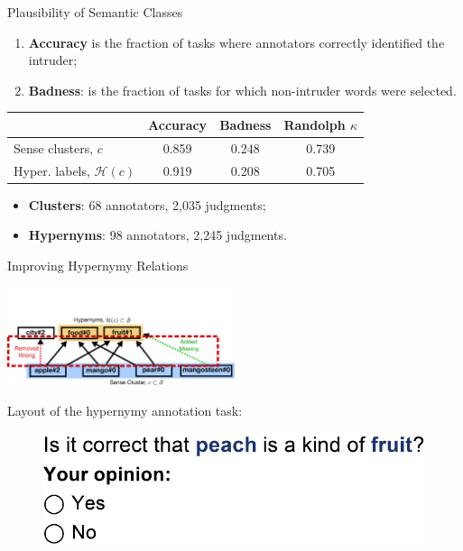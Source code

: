 \documentclass[usenames,dvipsnames]{beamer}
\begin{document}
\begin{frame}{Plausibility of Semantic Classes}


\begin{enumerate}
	\item \textbf{Accuracy} is the fraction of tasks where annotators correctly identified the intruder; 
	\item \textbf{Badness}: is the fraction of tasks for which non-intruder words were selected.  
\end{enumerate}

\pause

\begin{tabular}{l|c|c|c}
\textbf{} & \textbf{Accuracy} & \textbf{Badness} & \textbf{Randolph $\kappa$} \\ \toprule
Sense clusters, $c$ & 0.859 & 0.248 & 0.739 \\
Hyper. labels, $\mathcal{H}(c)$  & 0.919 & 0.208 & 0.705 \\
\end{tabular}

\pause 

\begin{itemize}
	\item \textbf{Clusters}: 68 annotators, 2,035 judgments; 
	\item \textbf{Hypernyms}: 98 annotators, 2,245 judgments.
\end{itemize}

\end{frame}



\begin{frame}{ Improving Hypernymy Relations }

\vspace{-20pt}

\begin{center}
\includegraphics[width=0.5\textwidth]{figures/e2}
\end{center}

\pause

Layout of the hypernymy annotation task:

\begin{figure}
  \centering
  \includegraphics[width=.75\textwidth]{figures/exp3-hit}
\end{figure}

\end{frame}
\end{document}
